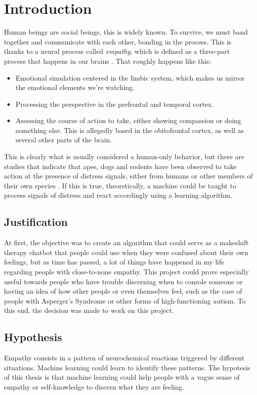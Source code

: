 \chapter{Introduction}
Human beings are social beings, this is widely known. To survive, we must band together and communicate with each other, bonding in the process. This is thanks to a neural process called \textit{empathy}, which is defined as a three-part process that happens in our brains \citep{rf1}. That roughly happens like this:
\begin{itemize}
	\item Emotional simulation centered in the limbic system, which makes us mirror the emotional elements we're watching.
	\item Processing the perspective in the prefrontal and temporal cortex.
	\item Assessing the course of action to take, either showing compassion or doing something else. This is allegedly based in the obitofrontal cortex, as well as several other parts of the brain.
\end{itemize}
This is clearly what is usually considered a human-only behavior, but there are studies that indicate that apes, dogs and rodents have been observed to take action at the presence of distress signals, either from humans or other members of their own species \citep{rf2}.
If this is true, theoretically, a machine could be taught to process signals of distress and react accordingly using a learning algorithm.

\section{Justification}
At first, the objective was to create an algorithm that could serve as a makeshift therapy chatbot that people could use when they were confused about their own feelings, but as time has passed, a lot of things have happened in my life regarding people with close-to-none empathy.
This project could prove especially useful towards people who have trouble discerning when to console someone or having an idea of how other people or even themselves feel, such as the case of people with Asperger's Syndrome or other forms of high-functioning autism.
To this end, the decision was made to work on this project.

\section{Hypothesis}
Empathy consists in a pattern of neurochemical reactions triggered by different situations. Machine learning could learn to identify these patterns. The hypotesis of this thesis is that machine learning could help people with a vague sense of empathy or self-knowledge to discern what they are feeling.

